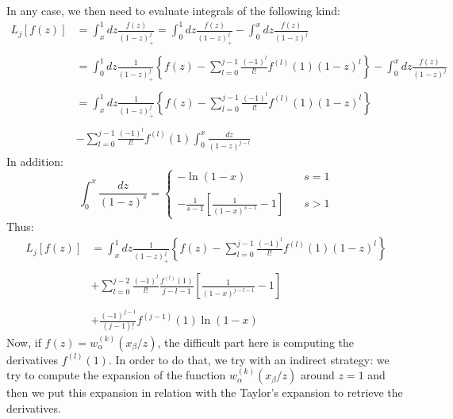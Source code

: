 \documentclass[10pt,a4paper]{article}
\begin{document}
In any case, we then need to evaluate integrals of the following kind:
\begin{equation}
\begin{array}{rl}
L_j[f(z)] &=\displaystyle \int_x^1 dz\frac{f(z)}{(1-z)_+^j} = \int_0^1
dz\frac{f(z)}{(1-z)_+^j} - \int_0^x dz\frac{f(z)}{(1-z)^j}\\
\\
& =\displaystyle \int_0^1 dz\frac{1}{(1-z)_+^j}\left\{f(z) - \sum_{l=0}^{j-1} \frac{(-1)^l}{l!}
  f^{(l)}(1) (1-z)^l
\right\} - \int_0^x dz\frac{f(z)}{(1-z)^j}\\
\\
& = \displaystyle \int_x^1 dz\frac{1}{(1-z)_+^j}\left\{f(z) - \sum_{l=0}^{j-1} \frac{(-1)^l}{l!}
  f^{(l)}(1) (1-z)^l
\right\} \\
\\
&- \displaystyle \sum_{l=0}^{j-1} \frac{(-1)^l}{l!}
  f^{(l)}(1) \int_0^x\frac{dz}{(1-z)^{j-l}}
\end{array}
\end{equation}
In addition:
\begin{equation}
\int_0^x\frac{dz}{(1-z)^{s}} =
\left\{
\begin{array}{ll}
- \ln(1-x) & \quad s = 1\\
\\
\displaystyle - \frac1{s-1}\left[\frac1{(1-x)^{s-1}}-1\right] & \quad s > 1
\end{array}
\right.
\end{equation}
Thus:
\begin{equation}
\begin{array}{rl}
L_j[f(z)] & = \displaystyle \int_x^1 dz\frac{1}{(1-z)_+^j}\left\{f(z) - \sum_{l=0}^{j-1} \frac{(-1)^l}{l!}
  f^{(l)}(1) (1-z)^l
\right\} \\
\\
& + \displaystyle \sum_{l=0}^{j-2} \frac{(-1)^l}{l!}
  \frac{f^{(l)}(1)}{j-l-1}\left[\frac1{(1-x)^{j-l-1}}-1\right]\\
\\
& + \displaystyle \frac{(-1)^{j-1}}{(j-1)!}f^{(j-1)}(1)\ln(1-x)
\end{array}
\end{equation}
Now, if $f(z)=w_{\alpha}^{(k)}(x_\beta/z)$, the difficult part here is
computing the derivatives $f^{(l)}(1)$. In order to do that, we try
with an indirect strategy: we try to compute the expansion of the
function $w_{\alpha}^{(k)}(x_\beta/z)$ around $z=1$ and then we put
this expansion in relation with the Taylor's expansion to retrieve the
derivatives.
\end{document}
